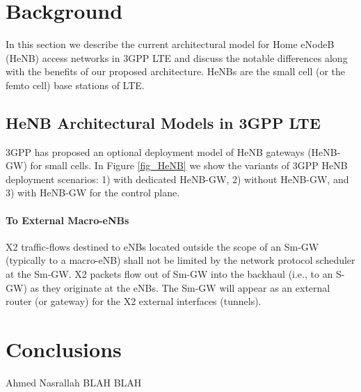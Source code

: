 \documentclass[journal,twoside,comsoc]{IEEEtran}
\begin{document}
\section{Background}
In this section we describe the current architectural model for
Home eNodeB (HeNB) access networks \cite{HeNB3GPP} in 3GPP LTE
and discuss the notable
differences along with the benefits of our proposed architecture.
HeNBs are the small cell (or the femto cell) base stations of LTE.


\subsection{HeNB Architectural Models in 3GPP LTE}
3GPP has proposed an optional deployment model of HeNB gateways
(HeNB-GW) for
small cells. In Figure \ref{fig_HeNB}
we show the variants of 3GPP HeNB deployment scenarios:
1) with dedicated HeNB-GW, 2) without HeNB-GW,
and 3) with HeNB-GW for the control plane.

\paragraph{To External Macro-eNBs}
X2 traffic-flows destined to eNBs located outside the scope of an
Sm-GW (typically
to a macro-eNB) shall not be limited by the network protocol scheduler
at the Sm-GW. X2 packets flow out of Sm-GW into the backhaul (i.e., to an
S-GW) as they originate at the eNBs. The Sm-GW will appear as an
external router (or gateway) for the X2 external interfaces (tunnels).

\section{Conclusions}





\begin{IEEEbiography}{Ahmed Nasrallah}
BLAH BLAH
\end{IEEEbiography}
\end{document}
